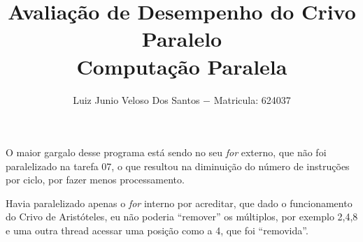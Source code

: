 \documentclass[a4paper,11pt,fleqn]{article}
\title{\vspace{-4cm}Avaliação de Desempenho do Crivo Paralelo \\ {\small Computação Paralela}}
\author{Luiz Junio Veloso Dos Santos $-$ Matricula: 624037}
\begin{document}
\maketitle

\begin{table}[h!]
\caption{Comparativo das métricas de performance do programa Perf.}
\centering
{}
\label{tab:my-table}
\end{table}

O maior gargalo desse programa está sendo no seu \textit{for} externo,
que não foi paralelizado na tarefa 07, o que resultou na diminuição
do número de instruções por ciclo, por fazer menos processamento.

Havia paralelizado apenas o \textit{for} interno por acreditar, que dado o
funcionamento do Crivo de Aristóteles, eu não poderia ``remover''
os múltiplos, por exemplo 2,4,8 e uma outra thread acessar uma posição
como a 4, que foi ``removida''. 
\end{document}
